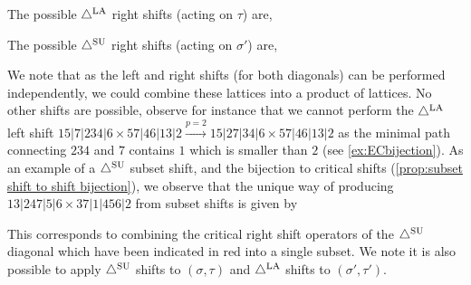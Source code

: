 \begin{example}
\begin{center}
{
}
\end{center}
The possible $\triangle^{\mathrm{LA}}$ right shifts (acting on $\tau$)  are,
\begin{center}
\end{center}
The possible $\triangle^{\mathrm{SU}}$ right shifts (acting on $\sigma'$) are,
\begin{center}
\end{center}
We note that as the left and right shifts (for both diagonals) can be performed independently, we could combine these lattices into a product of lattices. 
No other shifts are possible, observe for instance that we cannot perform the $\triangle^{\mathrm{LA}}$ left shift $15|7|234|6 \times 57|46|13|2 \xrightarrow{p=2} 15|27|34|6 \times 57|46|13|2$ as the minimal path connecting $234$ and $7$ contains $1$ which is smaller than $2$ (see \cref{ex:ECbijection}).
As an example of a $\triangle^{\mathrm{SU}}$ subset shift, and the bijection to critical shifts (\cref{prop:subset shift to shift bijection}), we observe that the unique way of producing $13|247|5|6 \times 37|1|456|2$ from subset shifts is given by
\begin{center}
\end{center}
This corresponds to combining the critical right shift operators of the $\triangle^{\mathrm{SU}}$ diagonal which have been indicated in red into a single subset.
We note it is also possible to apply $\triangle^{\mathrm{SU}}$ shifts to $(\sigma,\tau)$ and $\triangle^{\mathrm{LA}}$ shifts to $(\sigma',\tau')$. 
\end{example}


